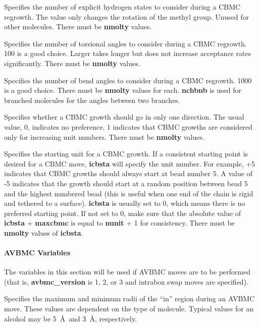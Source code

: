 \documentclass[12pt,letterpaper]{article}
\begin{document}
 Specifies the number of explicit
hydrogen states to consider during a CBMC regrowth. The
value only changes the rotation of the methyl group. Unused
for other molecules. There must be {\bf nmolty} values.

 Specifies the number of torsional
angles to consider during a CBMC regrowth. 100 is a good
choice. Larger takes longer but does not increase acceptance
rates significantly. There must be {\bf nmolty} values.

 Specifies the number of bend
angles to consider during a CBMC regrowth. 1000 is a good
choice. There must be \textbf{nmolty} values for each. {\bf
  nchbnb} is used for branched molecules for the angles
between two branches.

 Specifies whether a CBMC growth
should go in only one direction. The usual value, 0,
indicates no preference. 1 indicates that CBMC growths are
considered only for increasing unit numbers. There must be
{\bf nmolty} values.

 Specifies the starting unit for a
CBMC growth. If a consistent starting point is desired for a
CBMC move, {\bf icbsta} will specify the unit number. For
example, +5 indicates that CBMC growths should always start
at bead number 5. A value of -5 indicates that the growth
should start at a random position between bead 5 and the
highest numbered bead (this is useful when one end of the
chain is rigid and tethered to a surface). {\bf icbsta} is
usually set to 0, which means there is no preferred starting
point. If not set to 0, make sure that the absolute value of
{\bf icbsta} + {\bf maxcbmc} is equal to {\bf nunit} + 1 for
consistency. There must be {\bf nmolty} values of {\bf
  icbsta}.

\paragraph{AVBMC Variables}
\label{avbmc_vars}

The variables in this section will be used if AVBMC moves
are to be performed (that is, {\bf avbmc\_version} is 1, 2,
or 3 and intrabox swap moves are specified).

 Specifies the maximum and
minimum radii of the ``in'' region during an AVBMC move.
These values are dependent on the type of molecule. Typical
values for an alcohol may be 5~\AA~and 3~\AA, respectively.
\end{document}

